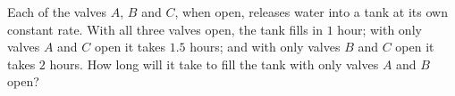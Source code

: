 Each of the valves $A$, $B$ and $C$, when open, releases water into a tank at its own constant rate. With all three valves open, the tank fills in $1$ hour; with only valves $A$ and $C$ open it takes $1.5$ hours; and with only valves $B$ and $C$ open it takes $2$ hours. How long will it take to fill the tank with only valves $A$ and $B$ open?
